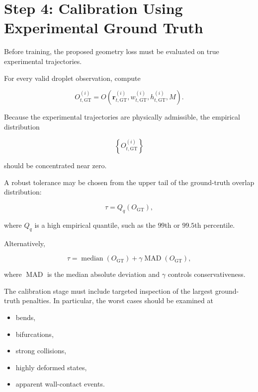\documentclass[11pt]{article}
\begin{document}
\section{Step 4: Calibration Using Experimental Ground Truth}

Before training, the proposed geometry loss must be evaluated on true experimental trajectories.

For every valid droplet observation, compute

\begin{equation}
    O_{t,\mathrm{GT}}^{(i)}
    =
    O
    \left(
    \bm{r}_{t,\mathrm{GT}}^{(i)},
    w_{t,\mathrm{GT}}^{(i)},
    h_{t,\mathrm{GT}}^{(i)},
    M
    \right).
\end{equation}

Because the experimental trajectories are physically admissible, the empirical distribution

\begin{equation}
    \left\{
    O_{t,\mathrm{GT}}^{(i)}
    \right\}
\end{equation}

should be concentrated near zero.

A robust tolerance may be chosen from the upper tail of the ground-truth overlap distribution:

\begin{equation}
    \tau
    =
    Q_{q}
    \left(
    O_{\mathrm{GT}}
    \right),
\end{equation}

where $Q_{q}$ is a high empirical quantile, such as the $99$th or $99.5$th percentile.

Alternatively,

\begin{equation}
    \tau
    =
    \operatorname{median}
    \left(
    O_{\mathrm{GT}}
    \right)
    +
    \gamma
    \operatorname{MAD}
    \left(
    O_{\mathrm{GT}}
    \right),
\end{equation}

where $\operatorname{MAD}$ is the median absolute deviation and $\gamma$ controls conservativeness.

The calibration stage must include targeted inspection of the largest ground-truth penalties. In particular, the worst cases should be examined at

\begin{itemize}[leftmargin=1.5em]
    \item bends,
    \item bifurcations,
    \item strong collisions,
    \item highly deformed states,
    \item apparent wall-contact events.
\end{itemize}
\end{document}
